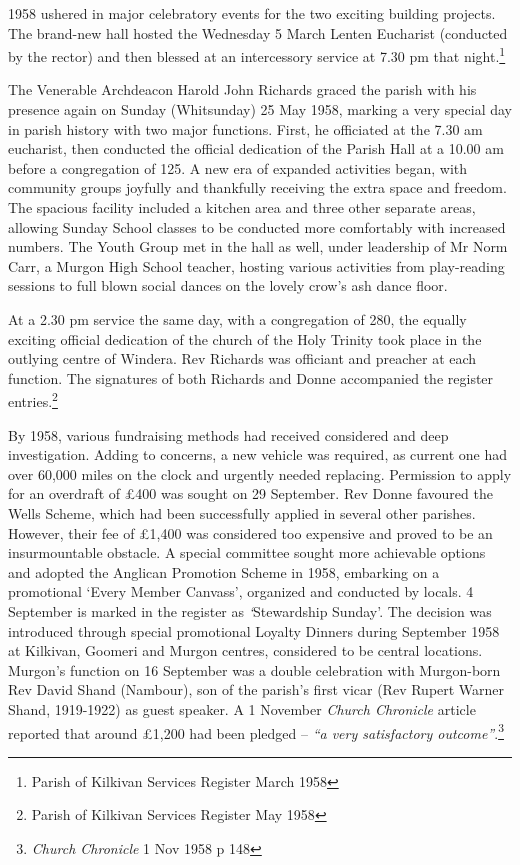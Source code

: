 1958 ushered in major celebratory events for the two exciting building projects. The brand-new hall hosted the Wednesday 5 March Lenten Eucharist (conducted by the rector) and then blessed at an intercessory service at 7.30 pm that night.\footnote{Parish of Kilkivan Services Register March 1958}

The Venerable Archdeacon Harold John Richards graced the parish with his presence again on Sunday (Whitsunday) 25 May 1958, marking a very special day in parish history with two major functions. First, he officiated at the 7.30 am eucharist, then conducted the official dedication of the Parish Hall at a 10.00 am before a congregation of 125. A new era of expanded activities began, with community groups joyfully and thankfully receiving the extra space and freedom. The spacious facility included a kitchen area and three other separate areas, allowing Sunday School classes to be conducted more comfortably with increased numbers. The Youth Group met in the hall as well, under leadership of Mr Norm Carr, a Murgon High School teacher, hosting various activities from play-reading sessions to full blown social dances on the lovely crow's ash dance floor.

At a 2.30 pm service the same day, with a congregation of 280, the equally exciting official dedication of the church of the Holy Trinity took place in the outlying centre of Windera. Rev Richards was officiant and preacher at each function. The signatures of both Richards and Donne accompanied the register entries.\footnote{Parish of Kilkivan Services Register May 1958}

By 1958, various fundraising methods had received considered and deep investigation. Adding to concerns, a new vehicle was required, as current one had over 60,000 miles on the clock and urgently needed replacing. Permission to apply for an overdraft of £400 was sought on 29 September. Rev Donne favoured the Wells Scheme, which had been successfully applied in several other parishes. However, their fee of £1,400 was considered too expensive and proved to be an insurmountable obstacle. A special committee sought more achievable options and adopted the Anglican Promotion Scheme in 1958, embarking on a promotional `Every Member Canvass', organized and conducted by locals. 4 September is marked in the register as \emph{`}Stewardship Sunday'. The decision was introduced through special promotional Loyalty Dinners during September 1958 at Kilkivan, Goomeri and Murgon centres, considered to be central locations. Murgon's function on 16 September was a double celebration with Murgon-born Rev David Shand (Nambour), son of the parish's first vicar (Rev Rupert Warner Shand, 1919-1922) as guest speaker. A 1 November \emph{Church Chronicle} article reported that around £1,200 had been pledged -- \emph{``a very satisfactory outcome''}.\footnote{\emph{Church Chronicle} 1 Nov 1958 p 148}


